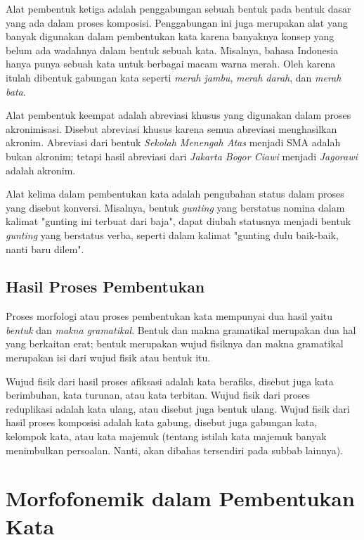 Alat pembentuk ketiga adalah penggabungan sebuah bentuk pada bentuk dasar yang ada dalam proses komposisi. Penggabungan ini juga merupakan alat yang banyak digunakan dalam pembentukan kata karena banyaknya konsep yang belum ada wadahnya dalam bentuk sebuah kata. Misalnya, bahasa Indonesia hanya punya sebuah kata untuk berbagai macam warna merah. Oleh karena itulah dibentuk gabungan kata seperti \textit{merah jambu}, \textit{merah darah}, dan \textit{merah bata}.

Alat pembentuk keempat adalah abreviasi khusus yang digunakan dalam proses akronimisasi. Disebut abreviasi khusus karena semua abreviasi menghasilkan akronim. Abreviasi dari bentuk \textit{Sekolah Menengah Atas} menjadi SMA adalah bukan akronim; tetapi hasil abreviasi dari \textit{Jakarta Bogor Ciawi} menjadi \textit{Jagorawi} adalah akronim.

Alat kelima dalam pembentukan kata adalah pengubahan status dalam proses yang disebut konversi. Misalnya, bentuk \textit{gunting} yang berstatus nomina dalam kalimat "gunting ini terbuat dari baja", dapat diubah statusnya menjadi bentuk \textit{gunting} yang berstatus verba, seperti dalam kalimat "gunting dulu baik-baik, nanti baru dilem".


\subsection{Hasil Proses Pembentukan}
\label{sec:hasilProsesPembentukan}

Proses morfologi atau proses pembentukan kata mempunyai dua hasil yaitu \textit{bentuk} dan \textit{makna gramatikal}. Bentuk dan makna gramatikal merupakan dua hal yang berkaitan erat; bentuk merupakan wujud fisiknya dan makna gramatikal merupakan isi dari wujud fisik atau bentuk itu.

Wujud fisik dari hasil proses afiksasi adalah kata berafiks, disebut juga kata berimbuhan, kata turunan, atau kata terbitan. Wujud fisik dari proses reduplikasi adalah kata ulang, atau disebut juga bentuk ulang. Wujud fisik dari hasil proses komposisi adalah kata gabung, disebut juga gabungan kata, kelompok kata, atau kata majemuk (tentang istilah kata majemuk banyak menimbulkan persoalan. Nanti, akan dibahas tersendiri pada subbab lainnya).


\section{Morfofonemik dalam Pembentukan Kata}
\label{sec:morfofonemikDalamPembentukanKata}

